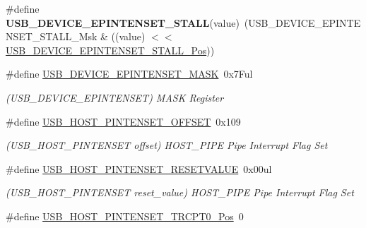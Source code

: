 \begin{DoxyCompactItemize}
\item 
\hypertarget{group___s_a_m_l21___u_s_b_gac4e5784093d62f719fc5d342919cbe59}{}\#define {\bfseries U\+S\+B\+\_\+\+D\+E\+V\+I\+C\+E\+\_\+\+E\+P\+I\+N\+T\+E\+N\+S\+E\+T\+\_\+\+S\+T\+A\+L\+L}(value)~(U\+S\+B\+\_\+\+D\+E\+V\+I\+C\+E\+\_\+\+E\+P\+I\+N\+T\+E\+N\+S\+E\+T\+\_\+\+S\+T\+A\+L\+L\+\_\+\+Msk \& ((value) $<$$<$ \hyperlink{group___s_a_m_l21___u_s_b_ga45cc411fbe61df59b01df54ed2a6b1f9}{U\+S\+B\+\_\+\+D\+E\+V\+I\+C\+E\+\_\+\+E\+P\+I\+N\+T\+E\+N\+S\+E\+T\+\_\+\+S\+T\+A\+L\+L\+\_\+\+Pos}))\label{group___s_a_m_l21___u_s_b_gac4e5784093d62f719fc5d342919cbe59}

\item 
\hypertarget{group___s_a_m_l21___u_s_b_ga0da53f5c3e1a5c5372830463dbf29d24}{}\#define \hyperlink{group___s_a_m_l21___u_s_b_ga0da53f5c3e1a5c5372830463dbf29d24}{U\+S\+B\+\_\+\+D\+E\+V\+I\+C\+E\+\_\+\+E\+P\+I\+N\+T\+E\+N\+S\+E\+T\+\_\+\+M\+A\+S\+K}~0x7\+Ful\label{group___s_a_m_l21___u_s_b_ga0da53f5c3e1a5c5372830463dbf29d24}

\begin{DoxyCompactList}\small\item\em (U\+S\+B\+\_\+\+D\+E\+V\+I\+C\+E\+\_\+\+E\+P\+I\+N\+T\+E\+N\+S\+E\+T) M\+A\+S\+K Register \end{DoxyCompactList}\item 
\hypertarget{group___s_a_m_l21___u_s_b_ga0cdfa1da0694cabbdad4079707f72c64}{}\#define \hyperlink{group___s_a_m_l21___u_s_b_ga0cdfa1da0694cabbdad4079707f72c64}{U\+S\+B\+\_\+\+H\+O\+S\+T\+\_\+\+P\+I\+N\+T\+E\+N\+S\+E\+T\+\_\+\+O\+F\+F\+S\+E\+T}~0x109\label{group___s_a_m_l21___u_s_b_ga0cdfa1da0694cabbdad4079707f72c64}

\begin{DoxyCompactList}\small\item\em (U\+S\+B\+\_\+\+H\+O\+S\+T\+\_\+\+P\+I\+N\+T\+E\+N\+S\+E\+T offset) H\+O\+S\+T\+\_\+\+P\+I\+P\+E Pipe Interrupt Flag Set \end{DoxyCompactList}\item 
\hypertarget{group___s_a_m_l21___u_s_b_gae48fd472180bff8dd9cea691ba2b74b3}{}\#define \hyperlink{group___s_a_m_l21___u_s_b_gae48fd472180bff8dd9cea691ba2b74b3}{U\+S\+B\+\_\+\+H\+O\+S\+T\+\_\+\+P\+I\+N\+T\+E\+N\+S\+E\+T\+\_\+\+R\+E\+S\+E\+T\+V\+A\+L\+U\+E}~0x00ul\label{group___s_a_m_l21___u_s_b_gae48fd472180bff8dd9cea691ba2b74b3}

\begin{DoxyCompactList}\small\item\em (U\+S\+B\+\_\+\+H\+O\+S\+T\+\_\+\+P\+I\+N\+T\+E\+N\+S\+E\+T reset\+\_\+value) H\+O\+S\+T\+\_\+\+P\+I\+P\+E Pipe Interrupt Flag Set \end{DoxyCompactList}\item 
\hypertarget{group___s_a_m_l21___u_s_b_ga4b7651b4e3d83869c6c045765079992f}{}\#define \hyperlink{group___s_a_m_l21___u_s_b_ga4b7651b4e3d83869c6c045765079992f}{U\+S\+B\+\_\+\+H\+O\+S\+T\+\_\+\+P\+I\+N\+T\+E\+N\+S\+E\+T\+\_\+\+T\+R\+C\+P\+T0\+\_\+\+Pos}~0\label{group___s_a_m_l21___u_s_b_ga4b7651b4e3d83869c6c045765079992f}


\end{DoxyCompactItemize}
